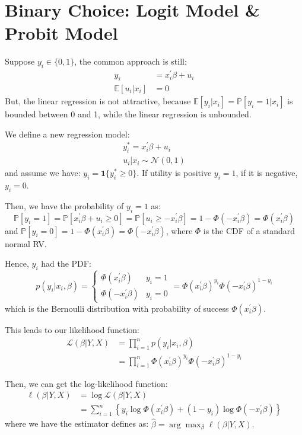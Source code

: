 \section{Binary Choice: Logit Model \& Probit Model}

Suppose $y_i \in \{0, 1\}$, the common approach is still:
\begin{align*}
    y_i &= x^{\prime} _i \beta + u_i\\
    \mathbb{E}[u_i|x_i] &= 0
\end{align*}
But, the linear regression is not attractive, because $\mathbb{E}[y_i|x_i] = \mathbb{P}[y_i=1|x_i]$ 
is bounded between 0 and 1, while the linear regression is unbounded.

We define a new regression model:
\begin{align*}
    y_i^* = x^{\prime} _i \beta + u_i \\
    u_i|x_i \sim \mathcal{N}(0, 1)
\end{align*}
and assume we have: $y_i = \mathbf{1}\{y_i^* \geq 0\}.$
If utility is positive $y_i=1$, if it is negative, $y_i=0$.

Then, we have the probability of $y_i=1$ as:
\[ 
\mathbb{P}[y_i=1]=\mathbb{P}[x_i^{\prime} \beta + u_i \geq 0] = \mathbb{P}[u_i \geq -x_i^{\prime} \beta] = 1 - \Phi(-x_i^{\prime} \beta)= \Phi(x_i^{\prime} \beta)
\]
and $\mathbb{P}[y_i=0] = 1 - \Phi(x_i^{\prime} \beta)=\Phi(-x^{\prime}_i \beta )$,
where $\Phi $ is the CDF of a standard normal RV.

Hence, $y_i$ had the PDF:
\[
p(y_i|x_i, \beta ) = \left\{\begin{matrix}
   \Phi (x_i^{\prime} \beta ) & y_i = 1\\
   \Phi (-x_i^{\prime} \beta) & y_i = 0
  \end{matrix}\right. = \Phi(x_i^{\prime} \beta )^{y_i} \Phi(-x_i^{\prime} \beta )^{1-y_i}
\]
which is the Bernoulli distribution with probability of success $\Phi(x_i^{\prime} \beta )$.

This leads to our likelihood function:
\begin{align*}
    \mathcal{L}(\beta |Y, X) &= \prod_{i=1}^{n} p(y_i|x_i, \beta )\\
    &= \prod_{i=1}^{n} \Phi(x_i^{\prime} \beta )^{y_i} \Phi(-x_i^{\prime} \beta )^{1-y_i}
\end{align*}
    
Then, we can get the log-likelihood function:
\begin{align*}
    \ell(\beta |Y, X) &= \log \mathcal{L}(\beta | Y, X)\\
    &= \sum_{i=1}^{n} \left\{y_i \log \Phi(x_i^{\prime} \beta ) + (1-y_i) \log \Phi(-x_i^{\prime} \beta )\right\}
\end{align*}
where we have the estimator defines as: $\hat{\beta} = \arg \max_{\beta} \ell(\beta|Y,X).$

